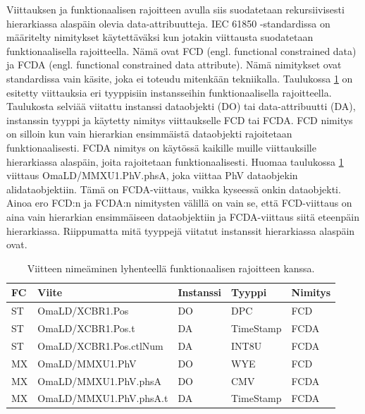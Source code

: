 Viittauksen ja funktionaalisen rajoitteen avulla siis suodatetaan rekursiivisesti hierarkiassa alaspäin olevia data-attribuutteja. IEC 61850 -standardissa on määritelty nimitykset käytettäväksi kun jotakin viittausta suodatetaan funktionaalisella rajoitteella. Nämä ovat FCD (engl. functional constrained data) ja FCDA (engl. functional constrained data attribute). Nämä nimitykset ovat standardissa vain käsite, joka ei toteudu mitenkään tekniikalla. Taulukossa \ref{tab:fcd-ja-fcda} on esitetty viittauksia eri tyyppisiin instansseihin funktionaalisella rajoitteella. Taulukosta selviää viitattu instanssi dataobjekti (DO) tai data-attribuutti (DA), instanssin tyyppi ja käytetty nimitys viittaukselle FCD tai FCDA. FCD nimitys on silloin kun vain hierarkian ensimmäistä dataobjekti rajoitetaan funktionaalisesti. FCDA nimitys on käytössä kaikille muille viittauksille hierarkiassa alaspäin, joita rajoitetaan funktionaalisesti. Huomaa taulukossa \ref{tab:fcd-ja-fcda} viittaus OmaLD/MMXU1.PhV.phsA, joka viittaa PhV dataobjekin alidataobjektiin. Tämä on FCDA-viittaus, vaikka kyseessä onkin dataobjekti. Ainoa ero FCD:n ja FCDA:n nimitysten välillä on vain se, että FCD-viittaus on aina vain hierarkian ensimmäiseen dataobjektiin ja FCDA-viittaus siitä eteenpäin hierarkiassa. Riippumatta mitä tyyppejä viitatut instanssit hierarkiassa alaspäin ovat. \cite[s.~55]{IEC61850-7-2} \cite[s.~63]{IEC61850-8-1}

\begin{table}[ht!]
	\caption{Viitteen nimeäminen lyhenteellä funktionaalisen rajoitteen kanssa.}
	\label{tab:fcd-ja-fcda}
	\begin{tabular}{l | l | l | l | l}
		\hline
		\textbf{FC} & \textbf{Viite} & \textbf{Instanssi} & \textbf{Tyyppi} & \textbf{Nimitys} \\
		\hline \hline
		ST & OmaLD/XCBR1.Pos & DO & DPC & FCD \\
		ST & OmaLD/XCBR1.Pos.t & DA & TimeStamp & FCDA \\
		ST & OmaLD/XCBR1.Pos.ctlNum & DA & INT8U & FCDA \\
		MX & OmaLD/MMXU1.PhV & DO & WYE & FCD \\
		MX & OmaLD/MMXU1.PhV.phsA & DO & CMV & FCDA \\
		MX & OmaLD/MMXU1.PhV.phsA.t & DA & TimeStamp & FCDA \\
		\hline
	\end{tabular}
\end{table}

